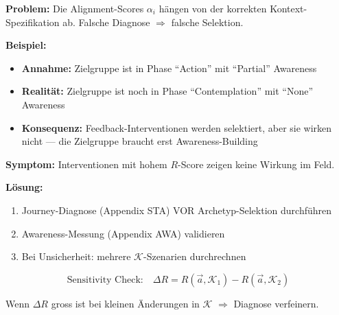 \begin{tcolorbox}[colback=red!5!white, colframe=red!75!black,
    title=\textbf{Failure Mode 1: Kontext-Fehldiagnose}]

\textbf{Problem:} Die Alignment-Scores $\alpha_i$ hängen von der korrekten Kontext-Spezifikation ab. Falsche Diagnose $\Rightarrow$ falsche Selektion.

\medskip
\textbf{Beispiel:}
\begin{itemize}[nosep]
    \item \textbf{Annahme:} Zielgruppe ist in Phase ``Action'' mit ``Partial'' Awareness
    \item \textbf{Realität:} Zielgruppe ist noch in Phase ``Contemplation'' mit ``None'' Awareness
    \item \textbf{Konsequenz:} Feedback-Interventionen werden selektiert, aber sie wirken nicht --- die Zielgruppe braucht erst Awareness-Building
\end{itemize}

\medskip
\textbf{Symptom:} Interventionen mit hohem $R$-Score zeigen keine Wirkung im Feld.

\textbf{Lösung:}
\begin{enumerate}[nosep]
    \item Journey-Diagnose (Appendix STA) VOR Archetyp-Selektion durchführen
    \item Awareness-Messung (Appendix AWA) validieren
    \item Bei Unsicherheit: mehrere $\mathcal{K}$-Szenarien durchrechnen
\end{enumerate}

\begin{equation*}
\text{Sensitivity Check:} \quad \Delta R = R(\vec{a}, \mathcal{K}_1) - R(\vec{a}, \mathcal{K}_2)
\end{equation*}

Wenn $\Delta R$ gross ist bei kleinen Änderungen in $\mathcal{K}$ $\Rightarrow$ Diagnose verfeinern.

\end{tcolorbox}

